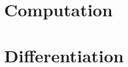 \documentclass[11pt]{report}
\begin{document}
\part{Computation}


\part{Differentiation}



\nocite{*}

\end{document}
